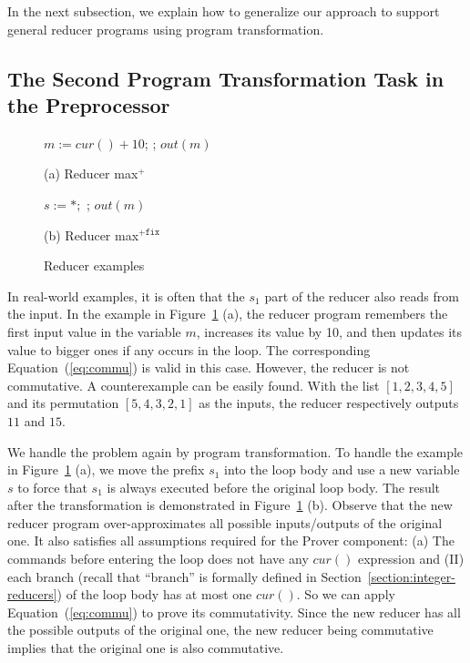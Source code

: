 \documentclass{llncs}
\newcommand{\cur}{cur()}
\begin{document}
In the next subsection, we explain how to generalize our approach to support general reducer programs using program transformation.

\subsection{The Second Program Transformation Task in the Preprocessor}
\label{sec:program_trans2}


\begin{figure}[t]
	\begin{minipage}{0.4\textwidth}
		\begin{algorithm}[H]
			\;\;$m := \cur + 10$; \;
			\Loop{}{
				$t:=\cur$\;
				\uIf{ $t> m$}{
					$m := t$ \;
				}
			};
			$out(m)$\;\;
		\end{algorithm}
		\caption*{(a) Reducer max$^+$}
	\end{minipage}
		\begin{minipage}{0.6\textwidth}
			\begin{algorithm}[H]
				$s:=*;$\;
				\Loop{}{
					\uIf{$s=1$}{$m := \cur + 10; s:= 2$}
					\uElse{
						$t:=\cur$\;
						\uIf{ $t > m$}{
							$m := t$ \;
						}
					}
				};
				$out(m)$
			\end{algorithm}
			\caption*{(b) Reducer max$^{+\mathtt{fix}}$}
		\end{minipage}
	\caption{Reducer examples}
	\label{fig:reducer_max}
\end{figure}





In real-world examples, it is often that the $s_1$ part of the reducer also reads from the input. In the example in Figure~\ref{fig:reducer_max} (a), the reducer program remembers the first input value in the variable $m$, increases its value by 10, and then updates its value to bigger ones if any occurs in the loop. The corresponding Equation~(\ref{eq:commu}) is valid in this case. However, the reducer is not commutative. A counterexample can be easily found. With the list $[1,2,3,4,5]$ and its permutation $[5,4,3,2,1]$ as the inputs, the reducer respectively outputs $11$ and $15$. 

We handle the problem again by program transformation. To handle the example in Figure~\ref{fig:reducer_max} (a), we move the prefix $s_1$ into the loop body and use a new variable $s$ to force that $s_1$ is always executed before the original loop body. The result after the transformation is demonstrated in Figure~\ref{fig:reducer_max} (b). Observe that the new reducer program over-approximates all possible inputs/outputs of the original one.
It also satisfies all assumptions required for the Prover component: (a) The commands before entering the loop does not have any $\cur$ expression and (II) each branch (recall that ``branch'' is formally defined in Section~\ref{section:integer-reducers}) of the loop body has at most one $\cur$. So we can apply Equation~(\ref{eq:commu}) to prove its commutativity.
Since the new reducer has all the possible outputs of the original one, the new reducer being commutative implies that the original one is also commutative. 
\end{document}
